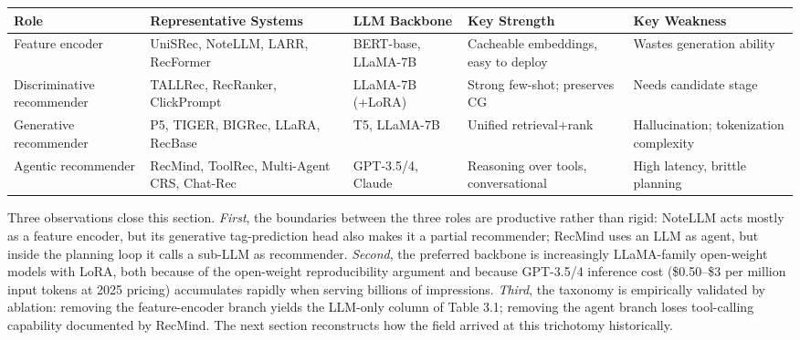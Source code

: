{\def\LTcaptype{none} %
\begin{longtable}[]{@{}
  >{\raggedright\arraybackslash}p{}
  >{\raggedright\arraybackslash}p{}
  >{\raggedright\arraybackslash}p{}
  >{\raggedright\arraybackslash}p{}
  >{\raggedright\arraybackslash}p{}@{}}
\toprule\noalign{}
\begin{minipage}[b]{\linewidth}\raggedright
Role
\end{minipage} & \begin{minipage}[b]{\linewidth}\raggedright
Representative Systems
\end{minipage} & \begin{minipage}[b]{\linewidth}\raggedright
LLM Backbone
\end{minipage} & \begin{minipage}[b]{\linewidth}\raggedright
Key Strength
\end{minipage} & \begin{minipage}[b]{\linewidth}\raggedright
Key Weakness
\end{minipage} \\
\midrule\noalign{}
\endhead
\bottomrule\noalign{}
\endlastfoot
Feature encoder & UniSRec, NoteLLM, LARR, RecFormer & BERT-base, LLaMA-7B & Cacheable embeddings, easy to deploy & Wastes generation ability \\
Discriminative recommender & TALLRec, RecRanker, ClickPrompt & LLaMA-7B (+LoRA) & Strong few-shot; preserves CG & Needs candidate stage \\
Generative recommender & P5, TIGER, BIGRec, LLaRA, RecBase & T5, LLaMA-7B & Unified retrieval+rank & Hallucination; tokenization complexity \\
Agentic recommender & RecMind, ToolRec, Multi-Agent CRS, Chat-Rec & GPT-3.5/4, Claude & Reasoning over tools, conversational & High latency, brittle planning \\
\end{longtable}
}

Three observations close this section. \emph{First}, the boundaries between the three roles are productive rather than rigid: NoteLLM acts mostly as a feature encoder, but its generative tag-prediction head also makes it a partial recommender; RecMind uses an LLM as agent, but inside the planning loop it calls a sub-LLM as recommender. \emph{Second}, the preferred backbone is increasingly LLaMA-family open-weight models with LoRA, both because of the open-weight reproducibility argument and because GPT-3.5/4 inference cost (\$0.50--\$3 per million input tokens at 2025 pricing) accumulates rapidly when serving billions of impressions. \emph{Third}, the taxonomy is empirically validated by ablation: removing the feature-encoder branch yields the LLM-only column of Table 3.1; removing the agent branch loses tool-calling capability documented by RecMind. The next section reconstructs how the field arrived at this trichotomy historically.


